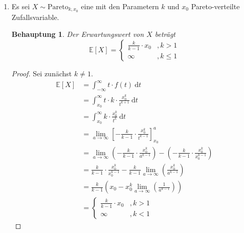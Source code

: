 \documentclass[a4paper]{scrartcl}
\newtheorem*{behaupt}{Behauptung}
\newcommand{\dif}{\ \mathrm{d}}
\newcommand{\e}{\mathbb{E}}
\def \blattnr {11}
\begin{document}
\begin{enumerate}[label=\bfseries \blattnr.\arabic*]
\begin{enumerate}
            \item
                Es sei $X \sim \mathrm{Pareto}_{k,x_0}$ eine mit den Parametern
                $k$ und $x_0$ Pareto-verteilte Zufallsvariable.
                \begin{behaupt}
                    Der Erwartungswert von $X$ beträgt
                    \begin{equation*}
                        \e[X] = \begin{cases}
                            \frac{k}{k-1} \cdot x_0 &, k>1 \\
                            \infty &, k\leq 1
                        \end{cases}
                    \end{equation*}
                \end{behaupt}
                \begin{proof}
                    Sei zunächst $k \neq 1$.
                    \begin{equation*}
                        \begin{split}
                            \e[X]
                            &= \int_{-\infty}^\infty t \cdot f(t) \dif t \\
                            &= \int_{x_0}^\infty t \cdot k \cdot \frac{x_0^k}{t^{k+1}} \dif t \\
                            &= \int_{x_0}^\infty k \cdot \frac{x_0^k}{t^k} \dif t \\
                            &= \lim_{a \to \infty} \left[ -\frac{k}{k-1} \cdot \frac{x_0^k}{t^{k-1}} \right]_{x_0}^a \\
                            &= \lim_{a \to \infty} \left( -\frac{k}{k-1} \cdot \frac{x_0^k}{a^{k-1}} \right) - \left( -\frac{k}{k-1} \cdot \frac{x_0^k}{x_0^{k-1}} \right) \\
                            &= \frac{k}{k-1} \cdot \frac{x_0^k}{x_0^{k-1}} -\frac{k}{k-1} \lim_{a \to \infty} \left(\frac{x_0^k}{a^{k-1}} \right) \\    
                            &= \frac{k}{k-1} \left(x_0 - x_0^k \lim_{a \to \infty} \left(\frac{1}{a^{k-1}} \right) \right) \\
                            &= \begin{cases}
                                \frac{k}{k-1} \cdot x_0 &, k > 1 \\
                                \infty &, k < 1
                            \end{cases}

\end{split}
\end{equation*}
\end{proof}
\end{enumerate}
\end{enumerate}
\end{document}

